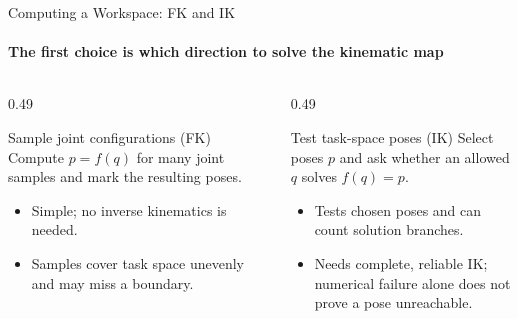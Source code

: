 \documentclass[aspectratio=169]{beamer}
\begin{document}
\begin{frame}[t]{Computing a Workspace: FK and IK}
    \framesubtitle{The first choice is which direction to solve the kinematic map}
    \small
    \begin{columns}[T,onlytextwidth]
        \begin{column}{0.49\textwidth}
            \begin{block}{Sample joint configurations (FK)}
                Compute $p=f(q)$ for many joint samples and mark the resulting poses.
            \end{block}
            \begin{itemize}
                \item Simple; no inverse kinematics is needed.
                \item Samples cover task space unevenly and may miss a boundary.
            \end{itemize}
        \end{column}
        \begin{column}{0.49\textwidth}
            \begin{block}{Test task-space poses (IK)}
                Select poses $p$ and ask whether an allowed $q$ solves $f(q)=p$.
            \end{block}
            \begin{itemize}
                \item Tests chosen poses and can count solution branches.
                \item Needs complete, reliable IK; numerical failure alone does not prove a pose unreachable.
            \end{itemize}
        \end{column}
    \end{columns}
\end{frame}
\end{document}
